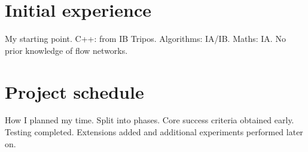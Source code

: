 \section{Initial experience}
My starting point. C++: from IB Tripos. Algorithms: IA/IB. Maths: IA. No prior knowledge of flow networks.

\section{Project schedule} \label{sec:prep-project-schedule}
How I planned my time. Split into phases. Core success criteria obtained early. Testing completed. Extensions added and additional experiments performed later on.